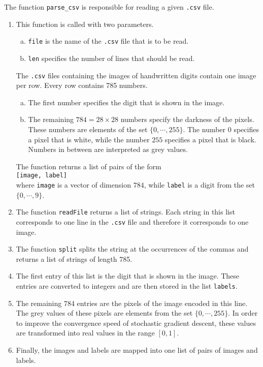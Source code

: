 The function \texttt{parse\_csv} is responsible for reading a given \texttt{.csv} file.
\begin{enumerate}
\item This function is called with two parameters.
      \begin{enumerate}[(a)]
      \item \texttt{file} is the name of the \texttt{.csv} file that is to be read.
      \item \texttt{len} specifies the number of lines that should be read.
      \end{enumerate}
      The \texttt{.csv} files containing the images of handwritten digits contain one image per row.
      Every row contains 785 numbers.
      \begin{enumerate}[(a)]
      \item The first number specifies the digit that is shown in the image.
      \item The remaining $784= 28 \times 28$ numbers specify the darkness of the pixels.
            These numbers are elements of the set $\{0,\cdots,255\}$.  The number $0$ specifies a pixel that is
            white, while the number $255$ specifies a pixel that is black.  Numbers in between are interpreted
            as grey values.
      \end{enumerate}
      The function returns a list of pairs of the form
      \\[0.2cm]
      \hspace*{1.3cm}
      \texttt{[image, label]}
      \\[0.2cm]
      where \texttt{image} is a vector of dimension $784$, while \texttt{label} is a digit from the set
      $\{0,\cdots,9\}$.
\item The function \texttt{readFile} returns a list of strings.  Each string in this list corresponds to
      one line in the \texttt{.csv} file and therefore it corresponds to one image.
\item The function \texttt{split} splits the string at the occurrences of the commas and returns a list of
      strings of length 785.
\item The first entry of this list is the digit that is shown in the image.  These entries are converted to
      integers and are then stored in the list \texttt{labels}.
\item The remaining 784 entries are the pixels of the image encoded in this line.  The grey values of these
      pixels are elements from the set $\{0,\cdots,255\}$.  In order to improve the convergence speed of stochastic
      gradient descent, these values are transformed into real values in the range $[0,1]$. 
\item Finally, the images and labels are mapped into one list of pairs of images and labels.
\end{enumerate}
